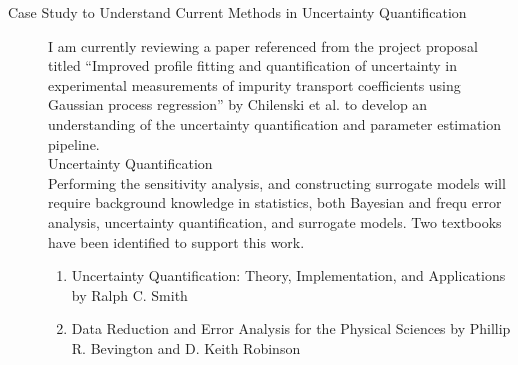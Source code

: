 \documentclass{article}
\begin{document}
\begin{description}
\item[Case Study to Understand Current Methods in Uncertainty Quantification]
I am currently reviewing a paper referenced from the project proposal titled “Improved profile fitting and quantification of uncertainty in experimental measurements of impurity transport coefficients using Gaussian process regression” by Chilenski et al. to develop an understanding of the uncertainty quantification and parameter estimation pipeline.\\
Uncertainty Quantification\\
Performing the sensitivity analysis, and constructing surrogate models will require background knowledge in statistics, both Bayesian and frequ error analysis, uncertainty quantification, and surrogate models. Two textbooks have been identified to support this work.\\
\begin{enumerate}
\item Uncertainty Quantification: Theory, Implementation, and Applications by Ralph C. Smith\\
\item Data Reduction and Error Analysis for the Physical Sciences by Phillip R. Bevington and D. Keith Robinson\\
\end{enumerate}
\end{description}

\newpage


\end{document}
